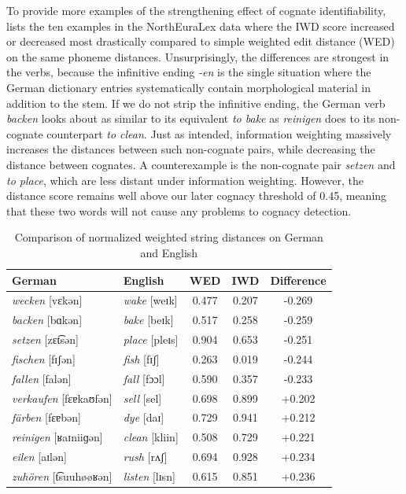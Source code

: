 To provide more examples of the strengthening effect of cognate identifiability,  lists the ten examples in the NorthEuraLex data where the IWD score increased or decreased most drastically compared to simple weighted edit distance (WED) on the same phoneme distances. Unsurprisingly, the differences are strongest in the verbs, because the  infinitive ending \textit{-en} is the single situation where the German dictionary entries systematically contain morphological material in addition to the stem. If we do not strip the infinitive ending, the German verb \textit{backen} looks about as similar to its  equivalent \textit{to bake} as \textit{reinigen} does to its non-cognate counterpart \textit{to clean}. Just as intended, information weighting massively increases the distances between such non-cognate pairs, while decreasing the distance between cognates. A counterexample is the non-cognate pair \textit{setzen} and \textit{to place}, which are less
distant under information weighting. However, the distance score remains well above our later cognacy threshold of 0.45, meaning that these two words will not cause any problems to cognacy detection.

\begin{table}
\centering
\begin{tabular}{llccc}
\hline \hline
German & English & WED & IWD & Difference\\ \hline
\textit{wecken} [vɛkən] & \textit{wake} [weɪk] & 0.477 & 0.207 & -0.269\\
\textit{backen} [bɑkən] & \textit{bake} [beɪk] & 0.517 & 0.258 & -0.259\\
\textit{setzen} [zɛt͡sən] & \textit{place} [pleɪs] & 0.904 & 0.653 & -0.251\\
\textit{fischen} [fɪʃən] & \textit{fish} [fɪʃ] & 0.263 & 0.019 & -0.244\\
\textit{fallen} [falən] & \textit{fall} [fɔɔl] & 0.590 & 0.357 & -0.233\\
\hline
\textit{verkaufen} [fɛɐkaʊfən] & \textit{sell} [sel] & 0.698 & 0.899 & +0.202\\
\textit{färben} [fɛɐbən] & \textit{dye} [daɪ] & 0.729 & 0.941 & +0.212\\
\textit{reinigen} [ʁaɪniiɡən] & \textit{clean} [kliin] & 0.508 & 0.729 & +0.221\\
\textit{eilen} [aɪlən] & \textit{rush} [rʌʃ] & 0.694 & 0.928 & +0.234\\
\textit{zuhören} [t͡suuhøøʁən] & \textit{listen} [lɪsn] & 0.615 & 0.851 & +0.236\\
\hline
\end{tabular}
\caption{Comparison of normalized weighted string distances on German and English}
\label{iwsa-ranking-eng-deu}
\end{table}

